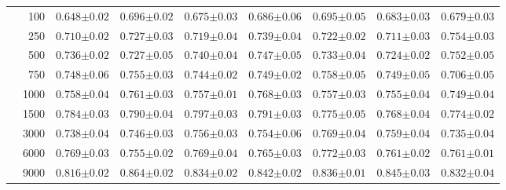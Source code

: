 \begin{landscape}
\begin{table}[p]
\begin{tabular}{cr| *{7}{C{2cm}}}
        & 100 & $0.648{\scriptscriptstyle\pm0.02}$ & $0.696{\scriptscriptstyle\pm0.02}$ & $0.675{\scriptscriptstyle\pm0.03}$ & $0.686{\scriptscriptstyle\pm0.06}$ & $0.695{\scriptscriptstyle\pm0.05}$ & $0.683{\scriptscriptstyle\pm0.03}$ & $0.679{\scriptscriptstyle\pm0.03}$ \\
        & 250 & $0.710{\scriptscriptstyle\pm0.02}$ & $0.727{\scriptscriptstyle\pm0.03}$ & $0.719{\scriptscriptstyle\pm0.04}$ & $0.739{\scriptscriptstyle\pm0.04}$ & $0.722{\scriptscriptstyle\pm0.02}$ & $0.711{\scriptscriptstyle\pm0.03}$ & $0.754{\scriptscriptstyle\pm0.03}$ \\
        & 500 & $0.736{\scriptscriptstyle\pm0.02}$ & $0.727{\scriptscriptstyle\pm0.05}$ & $0.740{\scriptscriptstyle\pm0.04}$ & $0.747{\scriptscriptstyle\pm0.05}$ & $0.733{\scriptscriptstyle\pm0.04}$ & $0.724{\scriptscriptstyle\pm0.02}$ & $0.752{\scriptscriptstyle\pm0.05}$ \\
        & 750 & $0.748{\scriptscriptstyle\pm0.06}$ & $0.755{\scriptscriptstyle\pm0.03}$ & $0.744{\scriptscriptstyle\pm0.02}$ & $0.749{\scriptscriptstyle\pm0.02}$ & $0.758{\scriptscriptstyle\pm0.05}$ & $0.749{\scriptscriptstyle\pm0.05}$ & $0.706{\scriptscriptstyle\pm0.05}$ \\
        & 1000 & $0.758{\scriptscriptstyle\pm0.04}$ & $0.761{\scriptscriptstyle\pm0.03}$ & $0.757{\scriptscriptstyle\pm0.01}$ & $0.768{\scriptscriptstyle\pm0.03}$ & $0.757{\scriptscriptstyle\pm0.03}$ & $0.755{\scriptscriptstyle\pm0.04}$ & $0.749{\scriptscriptstyle\pm0.04}$ \\
        & 1500 & $0.784{\scriptscriptstyle\pm0.03}$ & $0.790{\scriptscriptstyle\pm0.04}$ & $0.797{\scriptscriptstyle\pm0.03}$ & $0.791{\scriptscriptstyle\pm0.03}$ & $0.775{\scriptscriptstyle\pm0.05}$ & $0.768{\scriptscriptstyle\pm0.04}$ & $0.774{\scriptscriptstyle\pm0.02}$ \\
        & 3000 & $0.738{\scriptscriptstyle\pm0.04}$ & $0.746{\scriptscriptstyle\pm0.03}$ & $0.756{\scriptscriptstyle\pm0.03}$ & $0.754{\scriptscriptstyle\pm0.06}$ & $0.769{\scriptscriptstyle\pm0.04}$ & $0.759{\scriptscriptstyle\pm0.04}$ & $0.735{\scriptscriptstyle\pm0.04}$ \\
        & 6000 & $0.769{\scriptscriptstyle\pm0.03}$ & $0.755{\scriptscriptstyle\pm0.02}$ & $0.769{\scriptscriptstyle\pm0.04}$ & $0.765{\scriptscriptstyle\pm0.03}$ & $0.772{\scriptscriptstyle\pm0.03}$ & $0.761{\scriptscriptstyle\pm0.02}$ & $0.761{\scriptscriptstyle\pm0.01}$ \\
        & 9000 & $0.816{\scriptscriptstyle\pm0.02}$ & $\mathbf{0.864{\scriptscriptstyle\pm0.02}}$ & $0.834{\scriptscriptstyle\pm0.02}$ & $0.842{\scriptscriptstyle\pm0.02}$ & $0.836{\scriptscriptstyle\pm0.01}$ & $0.845{\scriptscriptstyle\pm0.03}$ & $0.832{\scriptscriptstyle\pm0.04}$ \\

\end{tabular}
\end{table}
\end{landscape}
